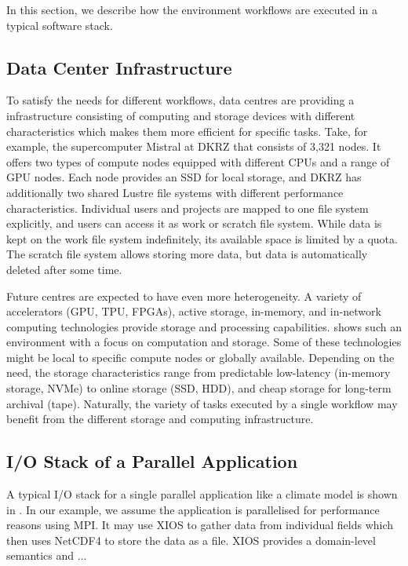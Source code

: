 \documentclass{superfri}
\newcommand{\jk}[1]{\todo[inline]{JK: #1}}
\begin{document}
In this section, we describe how the environment workflows are executed in a typical software stack.

\subsection{Data Center Infrastructure}

To satisfy the needs for different workflows, data centres are providing a infrastructure consisting of computing and storage devices with different characteristics which makes them more efficient for specific tasks.
Take, for example, the supercomputer Mistral at DKRZ that consists of 3,321 nodes.
It offers two types of compute nodes equipped with different CPUs and a range of GPU nodes.
Each node provides an SSD for local storage, and DKRZ has additionally two shared Lustre file systems with different performance characteristics.
Individual users and projects are mapped to one file system explicitly, and users can access it as work or scratch file system. While data is kept on the work file system indefinitely, its available space is limited by a quota.
The scratch file system allows storing more data, but data is automatically deleted after some time.

Future centres are expected to have even more heterogeneity. A variety of accelerators (GPU, TPU, FPGAs), active storage, in-memory, and in-network computing technologies provide storage and processing capabilities.
 shows such an environment with a focus on computation and storage.
Some of these technologies might be local to specific compute nodes or globally available.
Depending on the need, the storage characteristics range from predictable low-latency (in-memory storage, NVMe) to online storage (SSD, HDD), and cheap storage for long-term archival (tape).
\jk{Mention BBs, e.g., DDN IME}
Naturally, the variety of tasks executed by a single workflow may benefit from the different storage and computing infrastructure.


\subsection{I/O Stack of a Parallel Application}


A typical I/O stack for a single parallel application like a climate model is shown in .
In our example, we assume the application is parallelised for performance reasons using MPI.
It may use XIOS to gather data from individual fields which then uses NetCDF4 to store the data as a file.
XIOS provides a domain-level semantics and ...\jk{TODO}
\end{document}

